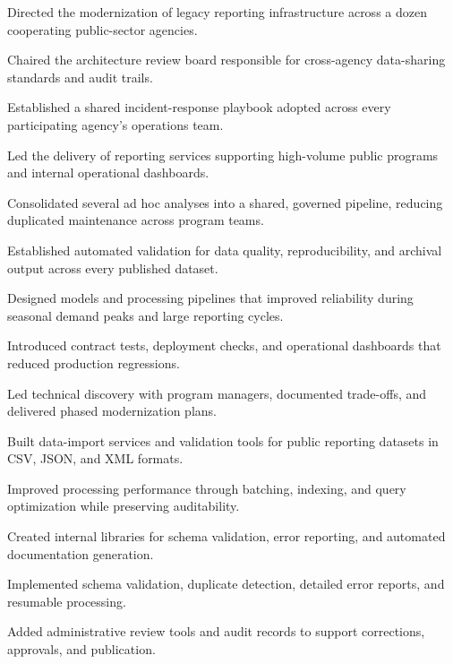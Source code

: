 \documentclass[fontsize=11pt, margin=narrow, medium=print]{careerdossier-resume}
\begin{document}
\MakeCDossierHeader

\begin{CDossierEntry}[title = {Modernization Program}, organization = {Continental Reliability Consortium}, location = {Ottawa, ON}, dates = {2010--Present}]
  \begin{CDossierItemize}
    \item Directed the modernization of legacy reporting infrastructure across a dozen cooperating public-sector agencies.
    \item Chaired the architecture review board responsible for cross-agency data-sharing standards and audit trails.
    \item Established a shared incident-response playbook adopted across every participating agency's operations team.
    \item Led the delivery of reporting services supporting high-volume public programs and internal operational dashboards.
    \item Consolidated several ad hoc analyses into a shared, governed pipeline, reducing duplicated maintenance across program teams.
    \item Established automated validation for data quality, reproducibility, and archival output across every published dataset.
    \item Designed models and processing pipelines that improved reliability during seasonal demand peaks and large reporting cycles.
    \item Introduced contract tests, deployment checks, and operational dashboards that reduced production regressions.
    \item Led technical discovery with program managers, documented trade-offs, and delivered phased modernization plans.
    \item Built data-import services and validation tools for public reporting datasets in CSV, JSON, and XML formats.
    \item Improved processing performance through batching, indexing, and query optimization while preserving auditability.
    \item Created internal libraries for schema validation, error reporting, and automated documentation generation.
    \item Implemented schema validation, duplicate detection, detailed error reports, and resumable processing.
    \item Added administrative review tools and audit records to support corrections, approvals, and publication.

\end{CDossierItemize}
\end{CDossierEntry}
\end{document}
